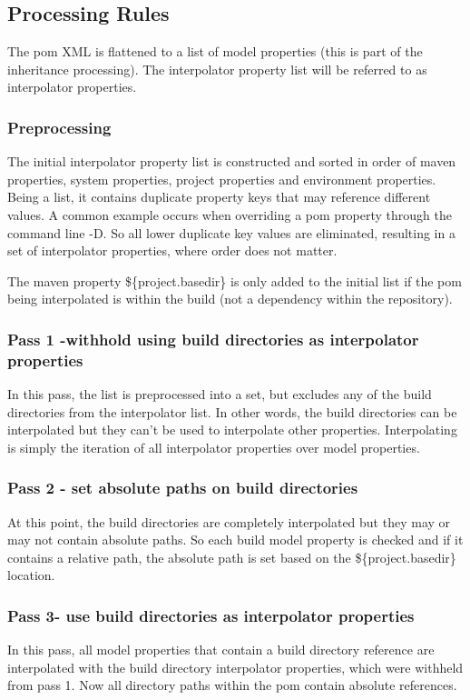 \documentclass[12pt]{amsart}
\begin{document}
\subsection{Processing Rules}
The pom XML is flattened to a list of model properties (this is part of the inheritance processing). The interpolator property list will be referred to as interpolator properties.
 
\subsubsection{Preprocessing}
The initial interpolator property list is constructed and sorted in order of maven properties, system properties, project properties and environment properties. Being a list, it contains duplicate property keys that may reference different values. A common example occurs when overriding a pom property through the command line -D. So all lower duplicate key values are eliminated, resulting in a set of interpolator properties, where order does not matter.

The maven property \$\{project.basedir\} is only added to the initial list if the pom being interpolated is within the build (not a dependency within the repository).

\subsubsection{Pass 1 -withhold using build directories as interpolator properties} In this pass, the list is preprocessed into a set, but excludes  any of the build directories from the interpolator list. In other words, the build directories can be interpolated but they can't be used to interpolate other properties. Interpolating is simply the iteration of all interpolator properties over model properties.

\subsubsection{Pass 2 - set absolute paths on build directories} At this point, the build directories are completely interpolated but they may or may not contain absolute paths. So each build model property is checked and if it contains a relative path, the absolute path is set based on the \$\{project.basedir\} location.

\subsubsection{Pass 3- use build directories as interpolator properties} In this pass, all model properties that contain a build directory reference are interpolated with the build directory interpolator properties, which were withheld from pass 1. Now all directory paths within the pom contain absolute references.
\end{document}

